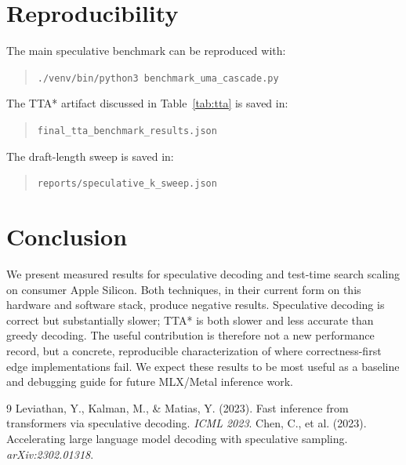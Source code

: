 \documentclass[11pt]{article}
\begin{document}
\section{Reproducibility}

The main speculative benchmark can be reproduced with:
\begin{quote}
\texttt{./venv/bin/python3 benchmark\_uma\_cascade.py}
\end{quote}

The TTA* artifact discussed in Table~\ref{tab:tta} is saved in:
\begin{quote}
\texttt{final\_tta\_benchmark\_results.json}
\end{quote}

The draft-length sweep is saved in:
\begin{quote}
\texttt{reports/speculative\_k\_sweep.json}
\end{quote}

\section{Conclusion}

We present measured results for speculative decoding and test-time search scaling on consumer Apple Silicon. Both techniques, in their current form on this hardware and software stack, produce negative results. Speculative decoding is correct but substantially slower; TTA* is both slower and less accurate than greedy decoding. The useful contribution is therefore not a new performance record, but a concrete, reproducible characterization of where correctness-first edge implementations fail. We expect these results to be most useful as a baseline and debugging guide for future MLX/Metal inference work.

\begin{thebibliography}{9}
 Leviathan, Y., Kalman, M., \& Matias, Y. (2023). Fast inference from transformers via speculative decoding. \textit{ICML 2023}.
 Chen, C., et al. (2023). Accelerating large language model decoding with speculative sampling. \textit{arXiv:2302.01318}.
\end{thebibliography}
\end{document}
